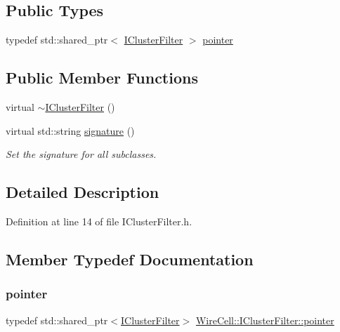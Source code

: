 \subsection*{Public Types}
\begin{DoxyCompactItemize}
\item 
typedef std\+::shared\+\_\+ptr$<$ \hyperlink{class_wire_cell_1_1_i_cluster_filter}{I\+Cluster\+Filter} $>$ \hyperlink{class_wire_cell_1_1_i_cluster_filter_a0d6a2ef27ba3547eaffbb50b6ba69d91}{pointer}
\end{DoxyCompactItemize}
\subsection*{Public Member Functions}
\begin{DoxyCompactItemize}
\item 
virtual \hyperlink{class_wire_cell_1_1_i_cluster_filter_abbbabb41dd8c8f4fe3a123bac732147a}{$\sim$\+I\+Cluster\+Filter} ()
\item 
virtual std\+::string \hyperlink{class_wire_cell_1_1_i_cluster_filter_a8cb61b08cad46dea00a76a5393a402f8}{signature} ()
\begin{DoxyCompactList}\small\item\em Set the signature for all subclasses. \end{DoxyCompactList}\end{DoxyCompactItemize}


\subsection{Detailed Description}


Definition at line 14 of file I\+Cluster\+Filter.\+h.



\subsection{Member Typedef Documentation}
\mbox{\label{class_wire_cell_1_1_i_cluster_filter_a0d6a2ef27ba3547eaffbb50b6ba69d91}} 
\subsubsection{\texorpdfstring{pointer}{pointer}}
{\footnotesize\ttfamily typedef std\+::shared\+\_\+ptr$<$\hyperlink{class_wire_cell_1_1_i_cluster_filter}{I\+Cluster\+Filter}$>$ \hyperlink{class_wire_cell_1_1_i_cluster_filter_a0d6a2ef27ba3547eaffbb50b6ba69d91}{Wire\+Cell\+::\+I\+Cluster\+Filter\+::pointer}}



